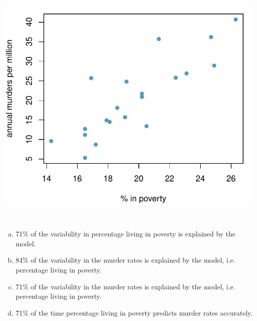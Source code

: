\documentclass[11pt,containsverbatim,handout,xcolor=xelatex,dvipsnames,table]{beamer}
\newcommand{\solnMult}[1]{#1}
\begin{document}

\begin{frame}
\frametitle{}

{
\begin{center}
\includegraphics[width=\textwidth]{figures/murder/annual_murders_per_mil_perc_pov}
\end{center}
}

$\:$ \\

\begin{enumerate}[(a)]

\item 71\% of the variability in percentage living in poverty is explained by the model.

\item 84\% of the variability in the murder rates is explained by the model, i.e. percentage living in poverty.

\item \solnMult{71\% of the variability in the murder rates is explained by the model, i.e. percentage living in poverty.}

\item 71\% of the time percentage living in poverty predicts murder rates accurately.

\end{enumerate}

\end{frame}
\end{document}
